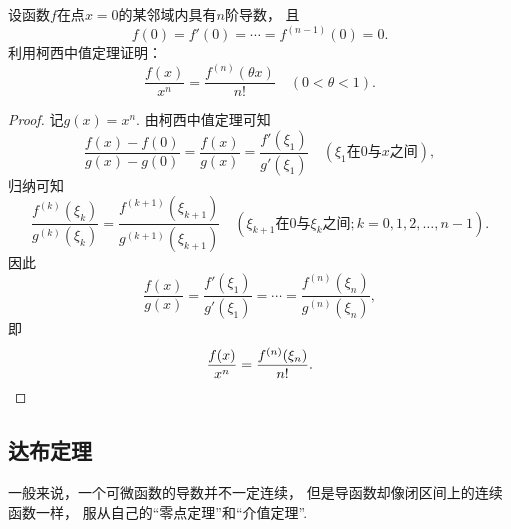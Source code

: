 \begin{example}
设函数\(f\)在点\(x=0\)的某邻域内具有\(n\)阶导数，
且\begin{equation*}
	f(0) = f'(0) = \dotsb = f^{(n-1)}(0) = 0.
\end{equation*}
利用柯西中值定理证明：\begin{equation*}
	\frac{f(x)}{x^n} = \frac{f^{(n)}(\theta x)}{n!}
	\quad(0<\theta<1).
\end{equation*}
\begin{proof}
记\(g(x) = x^n\).
由柯西中值定理可知\begin{equation*}
	\frac{f(x) - f(0)}{g(x) - g(0)}
	= \frac{f(x)}{g(x)}
	= \frac{f'(\xi_1)}{g'(\xi_1)}
	\quad(\text{$\xi_1$在$0$与$x$之间}),
\end{equation*}
归纳可知\begin{equation*}
	\frac{f^{(k)}(\xi_k)}{g^{(k)}(\xi_k)}
	= \frac{f^{(k+1)}(\xi_{k+1})}{g^{(k+1)}(\xi_{k+1})}
	\quad(\text{$\xi_{k+1}$在$0$与$\xi_k$之间};k=0,1,2,\dotsc,n-1).
\end{equation*}
因此\begin{equation*}
	\frac{f(x)}{g(x)}
	= \frac{f'(\xi_1)}{g'(\xi_1)}
	= \dotsb
	= \frac{f^{(n)}(\xi_n)}{g^{(n)}(\xi_n)},
\end{equation*}
即\begin{equation*}
	\frac{f(x)}{x^n}
	= \frac{f^{(n)}(\xi_n)}{n!}.
	\qedhere
\end{equation*}
\end{proof}
\end{example}

\subsection{达布定理}
一般来说，一个可微函数的导数并不一定连续，
但是导函数却像闭区间上的连续函数一样，
服从自己的“零点定理”和“介值定理”.

